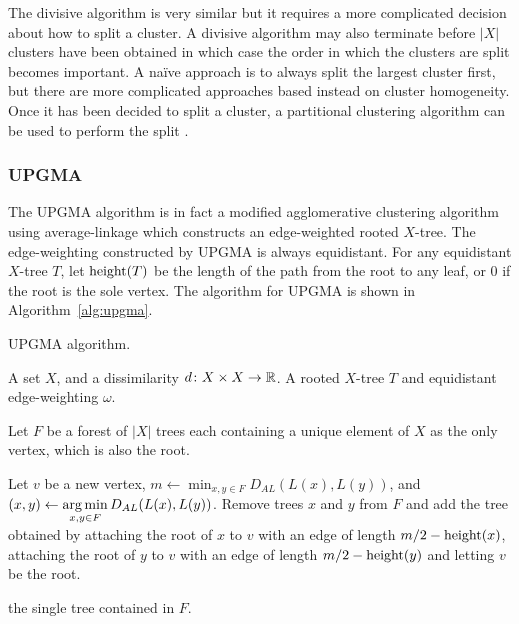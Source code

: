 The divisive algorithm is very similar but it requires a more complicated
decision about how to split a cluster.  A divisive algorithm may also
terminate before $|X|$ clusters have been obtained in which case the order in
which the clusters are split becomes important.  A naïve approach is to always
split the largest cluster first, but there are more complicated approaches
based instead on cluster homogeneity.  Once it has been decided to split a
cluster, a partitional clustering algorithm can be used to perform the split
\citep{ding2002cluster}.

\subsubsection{UPGMA}
\label{sec:upgma}

The UPGMA algorithm is in fact a modified agglomerative clustering algorithm
using average-linkage which constructs an edge-weighted rooted $X$-tree.  The
edge-weighting constructed by UPGMA is always equidistant.  For any
equidistant $X$-tree $T$, let $\operatorname{height}(T)$ be the length of the path from the
root to any leaf, or 0 if the root is the sole vertex.  The algorithm for
UPGMA is shown in Algorithm~\ref{alg:upgma}.

\begin{algorithm}[h]
  \caption{UPGMA algorithm.}
  \label{alg:upgma}

  \begin{algorithmic}
    \Require A set $X$, and a dissimilarity $d \colon X \times X \to {\mathbb R}$.
    \Ensure  A rooted $X$-tree $T$ and equidistant edge-weighting $\omega$.

    \State Let $F$ be a forest of $|X|$ trees each containing a unique element
    of $X$ as the only vertex, which is also the root.


       \State Let $v$ be a new vertex, $\displaystyle m \gets \min_{x,y
         \in F} D_{AL}(L(x),L(y))$, and $\displaystyle (x,y) \gets \operatorname*{arg\,min}_{x,y
         \in F} D_{AL}(L(x),L(y))$.
       \State Remove trees $x$ and $y$ from $F$ and add the tree obtained by
         attaching the root of $x$ to $v$ with an edge of length $m/2 -
         \operatorname{height}(x)$, attaching the root of $y$ to $v$ with an edge of length
         $m/2 - \operatorname{height}(y)$ and letting $v$ be the root.
    
    \EndWhile

    \State \Return the single tree contained in $F$.
  \end{algorithmic}
\end{algorithm}

